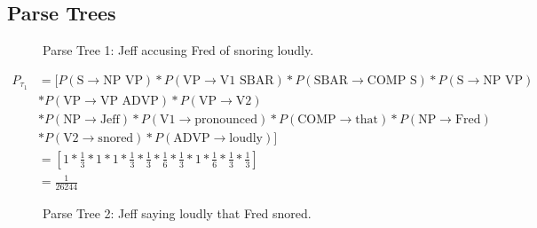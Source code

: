 \documentclass[11pt]{scrartcl}
\newcommand{\n}[1]{\ensuremath{\text{#1}}}
\begin{document}
\subsection{Parse Trees}

\begin{figure}[H]
\centering
{}
\caption{Parse Tree 1: Jeff accusing Fred of snoring loudly.}
\label{fig:parse_tree_1}
\end{figure}

\begin{align*}
P_{\tau_1} &= [ P(\n{S} \rightarrow \n{NP VP}) * P(\n{VP} \rightarrow \n{V1 SBAR}) * P(\n{SBAR} \rightarrow \n{COMP S}) * P(\n{S} \rightarrow \n{NP VP}) \\
&* P(\n{VP} \rightarrow \n{VP ADVP}) * P(\n{VP} \rightarrow \n{V2}) \\ 
&* P(\n{NP} \rightarrow \n{Jeff}) * P(\n{V1} \rightarrow \n{pronounced}) * P(\n{COMP} \rightarrow \n{that}) * P(\n{NP} \rightarrow \n{Fred}) \\
&* P(\n{V2} \rightarrow \n{snored}) * P(\n{ADVP} \rightarrow \n{loudly}) ] \\
&= \left[ 1 * \frac{1}{3} * 1 * 1 *\frac{1}{3} * \frac{1}{3} * \frac{1}{6} * \frac{1}{3} * 1 * \frac{1}{6} * \frac{1}{3} * \frac{1}{3} \right] \\
&= \frac{1}{26244}
\end{align*}

\begin{figure}[H]
\centering
{}
\caption{Parse Tree 2: Jeff saying loudly that Fred snored.}
\label{fig:parse_tree_2}
\end{figure}
\end{document}

